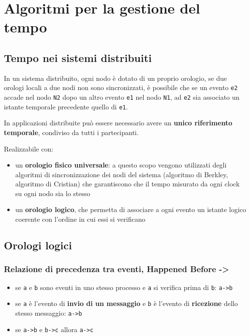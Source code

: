 \section{Algoritmi per la gestione del tempo}

\subsection{Tempo nei sistemi distribuiti}
In un sistema distribuito, ogni nodo è dotato di un proprio orologio, se due orologi locali a due nodi non sono sincronizzati, è possibile che se un evento \texttt{e2} accade nel nodo \texttt{N2} dopo un altro evento \texttt{e1} nel nodo \texttt{N1}, ad \texttt{e2} sia associato un istante temporale precedente quello di \texttt{e1}.

In applicazioni distribuite può essere necessario avere un \textbf{unico riferimento temporale}, condiviso da tutti i partecipanti.

Realizzabile con:
\begin{itemize}
    \item un \textbf{orologio fisico universale}: a questo scopo vengono utilizzati degli algoritmi di sincronizzazione dei nodi del sistema (algoritmo di Berkley, algoritmo di Cristian) che garantiscono che il tempo misurato da ogni clock su ogni nodo sia lo stesso
    \item un \textbf{orologio logico}, che permetta di associare a ogni evento un istante logico coerente con l'ordine in cui essi si verificano
\end{itemize}

\subsection{Orologi logici}

\subsubsection{Relazione di precedenza tra eventi, Happened Before ->}
\begin{itemize}
    \item se \texttt{a} e \texttt{b} sono eventi in uno stesso processo e \texttt{a} si verifica prima di \texttt{b}: \texttt{a->b}
    \item se \texttt{a} è l'evento di \textbf{invio di un messaggio} e \texttt{b} è l'evento di \textbf{ricezione} dello stesso messaggio: \texttt{a->b}
    \item se \texttt{a->b} e \texttt{b->c} allora \texttt{a->c}
\end{itemize}

